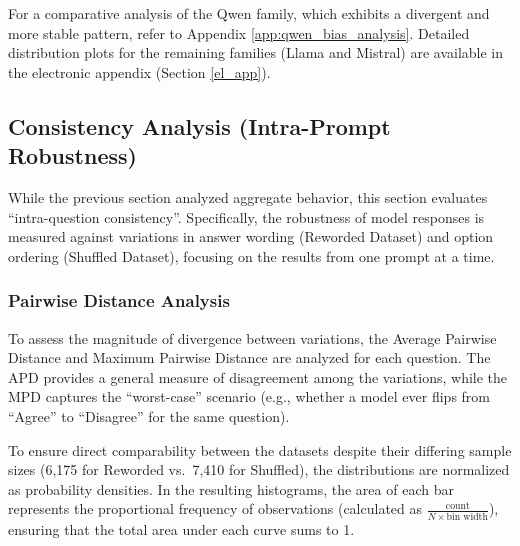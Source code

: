\vspace{0.2cm}
For a comparative analysis of the Qwen family, which exhibits a divergent and more stable pattern, refer to Appendix \ref{app:qwen_bias_analysis}. Detailed distribution plots for the remaining families (Llama and Mistral) are available in the electronic appendix (Section \ref{el_app}).


\subsection{Consistency Analysis (Intra-Prompt Robustness)}
\label{results:consistency}

While the previous section analyzed aggregate behavior, this section evaluates ``intra-question consistency''. Specifically, the robustness of model responses is measured against variations in answer wording (Reworded Dataset) and option ordering (Shuffled Dataset), focusing on the results from one prompt at a time.

\subsubsection{Pairwise Distance Analysis}
\label{results:pairwise_distances}
To assess the magnitude of divergence between variations, the Average Pairwise Distance and Maximum Pairwise Distance are analyzed for each question. The APD provides a general measure of disagreement among the variations, while the MPD captures the ``worst-case'' scenario (e.g., whether a model ever flips from ``Agree'' to ``Disagree'' for the same question).

To ensure direct comparability between the datasets despite their differing sample sizes (6,175 for Reworded vs.\ 7,410 for Shuffled), the distributions are normalized as probability densities. In the resulting histograms, the area of each bar represents the proportional frequency of observations (calculated as $\frac{\text{count}}{N \times \text{bin width}}$), ensuring that the total area under each curve sums to 1.

\vspace{-0.4cm}
